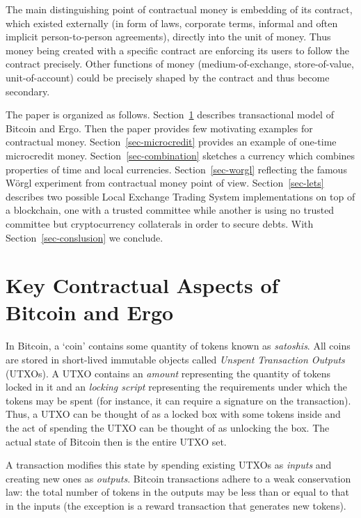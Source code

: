 \documentclass[]{llncs}   %
\begin{document}
The main distinguishing point of contractual money is embedding of its contract, which existed externally (in form of laws, corporate terms, informal and often implicit person-to-person agreements), directly into the unit of money. Thus money being created with a specific contract are enforcing its users to follow the contract precisely. Other functions of money (medium-of-exchange, store-of-value, unit-of-account) could be precisely shaped by the contract and thus become secondary.

The paper is organized as follows. Section~\ref{sec-txmodel} describes transactional model of Bitcoin and Ergo. Then the paper provides few motivating examples for contractual money. Section~\ref{sec-microcredit} provides an example of one-time microcredit money. Section~\ref{sec-combination} sketches a currency which combines properties of time and local currencies. Section~\ref{sec-worgl} reflecting the famous W\"{o}rgl experiment from contractual money point of view. Section~\ref{sec-lets} describes two possible Local Exchange Trading System implementations on top of a blockchain, one with a trusted committee while another is using no trusted committee but cryptocurrency collaterals in order to secure debts. With Section~\ref{sec-conslusion} we conclude.


\section{Key Contractual Aspects of Bitcoin and Ergo}
\label{sec-txmodel}

In Bitcoin, a `coin' contains some quantity of tokens known as {\em satoshis}. All coins are stored in short-lived immutable objects called {\em Unspent Transaction Outputs} (UTXOs). 
A UTXO contains an {\em amount} representing the quantity of tokens locked in it and an {\em locking script} representing the requirements under which the tokens may be spent (for instance, it can require a signature on the transaction). Thus, a UTXO can be thought of as a locked box with some tokens inside and the act of spending the UTXO can be thought of as unlocking the box.
The actual state of Bitcoin then is the entire UTXO set. 

A transaction modifies this state by spending existing UTXOs as {\em inputs} and creating new ones as {\em outputs}. 
Bitcoin transactions adhere to a weak conservation law: the total number of tokens in the outputs may be less than or equal to that in the inputs (the exception is a reward transaction that generates new tokens).
\end{document}
